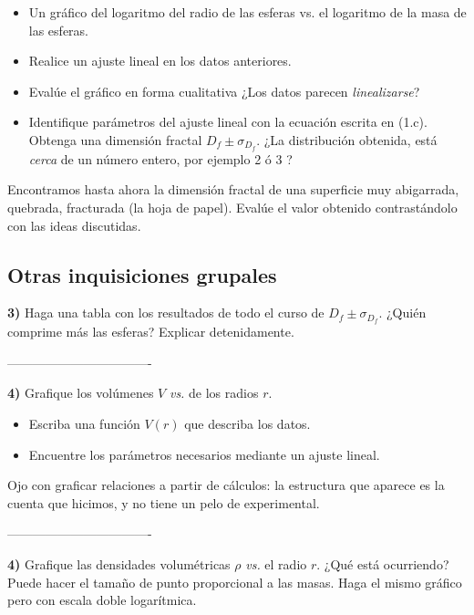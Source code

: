 \documentclass[10pt,a4paper]{article}
\numberwithin{equation}{section}
\begin{document}
\begin{itemize}
\item[$\bullet$] Un gráfico del logaritmo del radio de las esferas vs. el logaritmo de la masa de las esferas. 
\item[$\bullet$] Realice un ajuste lineal en los datos anteriores.
\end{itemize} 


\begin{itemize}
\item[a)] Evalúe el gráfico en forma cualitativa ¿Los datos parecen \textit{linealizarse}?
\item[b)]  Identifique parámetros del ajuste lineal con la ecuación escrita en (1.c). Obtenga una dimensión fractal $D_f \pm \sigma_{D_f}$. ¿La distribución obtenida, está \textit{cerca} de un número entero, por ejemplo 2 ó 3 ?
\end{itemize}

Encontramos hasta ahora la dimensión fractal de una superficie muy abigarrada, quebrada, fracturada (la hoja de papel). Evalúe el valor obtenido contrastándolo con las ideas discutidas.



\subsection*{Otras inquisiciones grupales}

\noindent \textbf{3)} Haga una tabla con los resultados de todo el curso de $D_f \pm \sigma_{D_f}$. ¿Quién comprime más las esferas? Explicar detenidamente.

\-----------------------------------\


\noindent \textbf{4)} Grafique los volúmenes $V$ \textit{vs.} de los radios $r$.

\begin{itemize}
\item[a)] Escriba una función $V(r)$ que describa los datos.
\item[b)] Encuentre los parámetros necesarios mediante un ajuste lineal.
\end{itemize}

Ojo con graficar relaciones a partir de cálculos: la estructura que aparece es la cuenta que hicimos, y no tiene un pelo de experimental.

\-----------------------------------\

\noindent \textbf{4)} Grafique las densidades volumétricas $\rho$ \textit{vs.} el radio $r$. ¿Qué está ocurriendo? Puede hacer el tamaño de punto proporcional a las masas. Haga el mismo gráfico pero con escala doble logarítmica.
\end{document}
